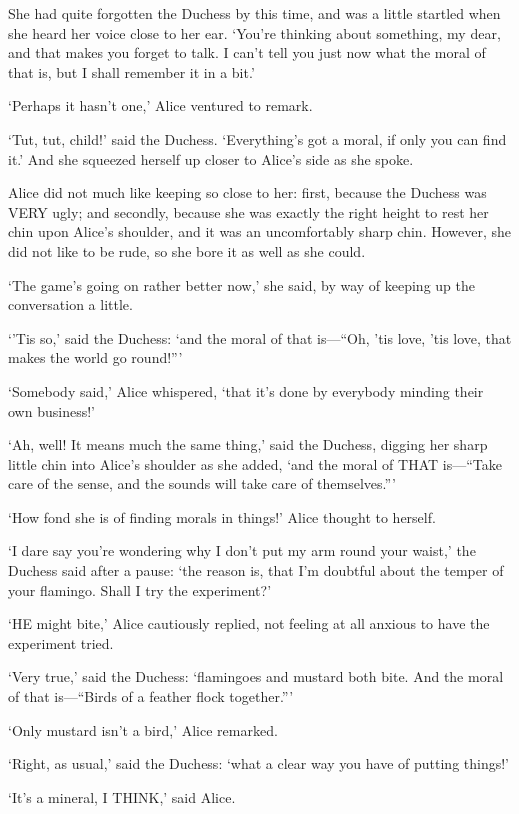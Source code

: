 \documentclass[12pt]{book}
\begin{document}
\begin{Parallel}[p]{}{}
{She had quite forgotten the Duchess by this time, and was a little startled when she heard her voice close to her ear. ‘You’re thinking about something, my dear, and that makes you forget to talk. I can’t tell you just now what the moral of that is, but I shall remember it in a bit.’

‘Perhaps it hasn’t one,’ Alice ventured to remark.

‘Tut, tut, child!’ said the Duchess. ‘Everything’s got a moral, if only you can find it.’ And she squeezed herself up closer to Alice’s side as she spoke.

Alice did not much like keeping so close to her: first, because the Duchess was VERY ugly; and secondly, because she was exactly the right height to rest her chin upon Alice’s shoulder, and it was an uncomfortably sharp chin. However, she did not like to be rude, so she bore it as well as she could.

‘The game’s going on rather better now,’ she said, by way of keeping up the conversation a little.

‘’Tis so,’ said the Duchess: ‘and the moral of that is—“Oh, ’tis love, ’tis love, that makes the world go round!”’

‘Somebody said,’ Alice whispered, ‘that it’s done by everybody minding their own business!’

‘Ah, well! It means much the same thing,’ said the Duchess, digging her sharp little chin into Alice’s shoulder as she added, ‘and the moral of THAT is—“Take care of the sense, and the sounds will take care of themselves.”’

‘How fond she is of finding morals in things!’ Alice thought to herself.

‘I dare say you’re wondering why I don’t put my arm round your waist,’ the Duchess said after a pause: ‘the reason is, that I’m doubtful about the temper of your flamingo. Shall I try the experiment?’

‘HE might bite,’ Alice cautiously replied, not feeling at all anxious to have the experiment tried.

‘Very true,’ said the Duchess: ‘flamingoes and mustard both bite. And the moral of that is—“Birds of a feather flock together.”’

‘Only mustard isn’t a bird,’ Alice remarked.

‘Right, as usual,’ said the Duchess: ‘what a clear way you have of putting things!’

‘It’s a mineral, I THINK,’ said Alice.

}
\end{Parallel}
\end{document}
